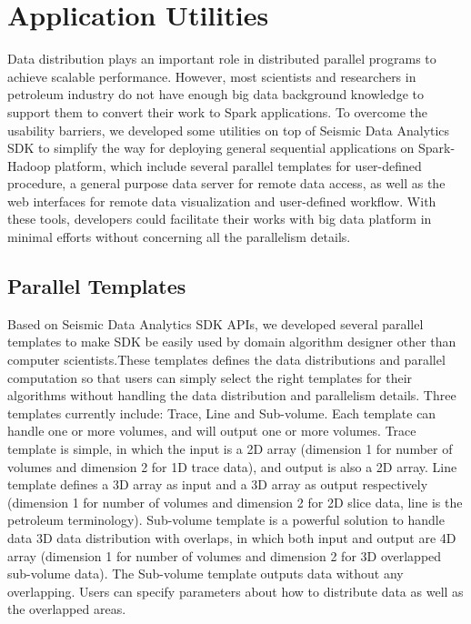 \section{Application Utilities}

Data distribution plays an important role in distributed parallel programs to achieve scalable performance. However, most scientists and researchers in petroleum industry do not have enough big data background knowledge to support them to convert their work to Spark applications. To overcome the usability barriers, we developed some utilities on top of Seismic Data Analytics SDK to simplify the way for deploying general sequential applications on Spark-Hadoop platform, which include several parallel templates for user-defined procedure, a general purpose data server for remote data access, as well as the web interfaces for remote data visualization and user-defined workflow. With these tools, developers could facilitate their works with big data platform in minimal efforts without concerning all the parallelism details.

\subsection{Parallel Templates}

Based on Seismic Data Analytics SDK APIs, we developed several parallel templates to make SDK be easily used by domain algorithm designer other than computer scientists.These templates defines the data distributions and parallel computation so that users can simply select the right templates for their algorithms without handling the data distribution and parallelism details. Three templates currently include: Trace, Line and Sub-volume. Each template can handle one or more volumes, and will output one or more volumes. Trace template is simple, in which the input is a 2D array (dimension 1 for number of volumes and dimension 2 for 1D trace data), and output is also a 2D array. Line template defines a 3D array as input and a 3D array as output respectively (dimension 1 for number of volumes and dimension 2 for 2D slice data, line is the petroleum terminology). Sub-volume template is a powerful solution to handle data 3D data distribution with overlaps, in which both input and output are 4D array (dimension 1 for number of volumes and dimension 2 for 3D overlapped sub-volume data). The Sub-volume template outputs data without any overlapping. Users can specify parameters about how to distribute data as well as the overlapped areas. 


